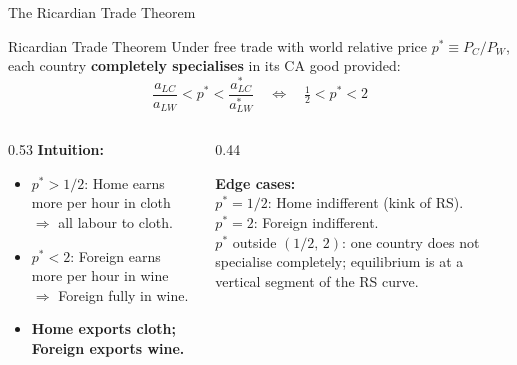 \documentclass[aspectratio=169]{beamer}
\begin{document}
\begin{frame}{The Ricardian Trade Theorem}
\begin{block}{Ricardian Trade Theorem}
Under free trade with world relative price
$p^{*}\equiv P_C/P_W$, each country
\textbf{completely specialises} in its CA good
provided:
\[\frac{a_{LC}}{a_{LW}}<p^{*}<\frac{a_{LC}^{*}}{a_{LW}^{*}}
  \quad\Longleftrightarrow\quad \tfrac{1}{2}<p^{*}<2\]
\end{block}
\vspace{0.3em}
\begin{columns}[T]
\begin{column}{0.53\textwidth}
\textbf{Intuition:}
\begin{itemize}\small
  \item $p^{*}>1/2$: Home earns more per hour in cloth
        $\Rightarrow$ all labour to cloth.
  \item $p^{*}<2$: Foreign earns more per hour in wine
        $\Rightarrow$ Foreign fully in wine.
  \item \textbf{Home exports cloth; Foreign exports wine.}
\end{itemize}
\end{column}
\begin{column}{0.44\textwidth}
\begin{varbox}
\small\textbf{Edge cases:}\\[0.2em]
$p^{*}=1/2$: Home indifferent (kink of RS).\\
$p^{*}=2$: Foreign indifferent.\\[0.2em]
$p^{*}$ outside $(1/2,\,2)$: one country does not
specialise completely; equilibrium is at a vertical
segment of the RS curve.
\end{varbox}
\end{column}
\end{columns}
\end{frame}

\end{document}
